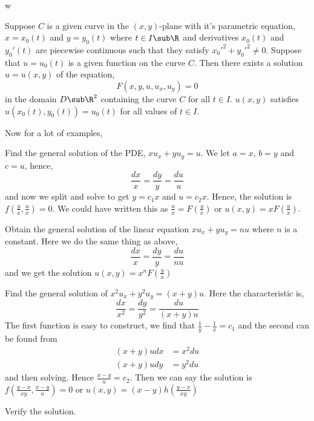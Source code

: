 w
\begin{nthm}
  Suppose $C$ is a given curve in the $(x, y)$-plane with it's parametric equation, $x = x_0(t)$ and $y = y_0(t)$ where $t \in I \sub \R$ and derivatives $x_0(t)$ and $y_0'(t)$ are piecewise continuous such that they satisfy $x_0'^2 + y_0'^2 \ne 0$. Suppose that $u = u_0(t)$ is a given function on the curve $C$. Then there exists a solution $u = u(x, y)$ of the equation,
  $$ F(x, y, u, u_x, u_y) = 0 $$
  in the domain $D \sub \R^2$ containing the curve $C$ for all $t \in I$. $u(x, y)$ satisfies $u(x_0(t), y_0(t)) = u_0(t)$ for all values of $t \in I$.
\end{nthm}

Now for a lot of examples,
\begin{eg}
  Find the general solution of the PDE, $xu_x + yu_y = u$. We let $a = x$, $b = y$ and $c = u$, hence,
  $$ \frac{dx}{x} = \frac{dy}{y} = \frac{du}{u} $$
  and now we split and solve to get $y = c_1x$ and $u = c_2x$. Hence, the solution is $f\left( \frac{y}{x}, \frac{u}{x} \right) = 0$. We could have written this as $\frac{u}{x} = F\left( \frac{y}{x} \right)$ or $u(x, y) = xF\left( \frac{y}{x} \right)$.
\end{eg}

\begin{eg}
  Obtain the general solution of the linear equation $xu_x + yu_y = nu$ where $n$ is a constant. Here we do the same thing as above,
  $$ \frac{dx}{x} = \frac{dy}{y} = \frac{du}{nu} $$
  and we get the solution $u(x, y) = x^nF\left( \frac{y}{x} \right)$
\end{eg}

\begin{eg}
  Find the general solution of $x^2u_x + y^2u_y = (x + y)u$. Here the characteristic is,
  $$ \frac{dx}{x^2} = \frac{dy}{y^2} = \frac{du}{(x + y)u}$$
  The first function is easy to construct, we find that $\frac{1}{y} - \frac{1}{x} = c_1$ and the second can be found from
  \begin{align}
    (x + y)udx &= x^2du \\
    (x + y)udy &= y^2du
  \end{align}
  and then solving. Hence $\frac{x-y}{u} = c_2$. Then we can say the solution is $f(\frac{y - x}{xy}, \frac{x - y}{u}) = 0$ or $u(x, y) = (x - y)h(\frac{y - x}{xy})$
\end{eg}
\begin{exercise}
  Verify the solution.
\end{exercise}

